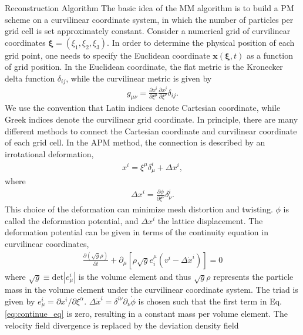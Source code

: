 \begin{section}{Reconstruction Algorithm}
  \label{sec:reconstruction}
   The basic idea of the MM algorithm is to build a PM scheme on a curvilinear coordinate system, 
in which the number of particles per grid cell is set approximately constant. 
    Consider a numerical grid of curvilinear coordinates 
$\bm{\xi}=\left(\xi_1,\xi_2,\xi_3\right)$. In order to determine the physical position 
of each grid point, one needs to specify the Euclidean coordinate $\bm{x}(\bm{\xi},t)$ 
as a function of grid position. In the Euclidean coordinate, the flat metric is the Kronecker 
delta function $\delta_{ij}$, while the curvilinear metric is given by
\begin{align}
    g_{\mu\nu}=\frac{\partial x^i}{\partial \xi ^\mu} \frac{\partial x^j}{\partial \xi ^\nu}\delta_{ij}.
\end{align}
    We use the convention that Latin indices denote Cartesian coordinate, 
while Greek indices denote the curvilinear grid coordinate.
    In principle, there are many different methods to connect the Cartesian 
coordinate and curvilinear coordinate of each grid cell. In the APM method, the 
connection is described by an irrotational deformation,
\begin{align}
    x^i=\xi ^\mu \delta ^i _\mu + \Delta x^i,
\end{align}
where
\begin{align}
 \label{eq:disp}
    \Delta x^i=\frac{\partial \phi}{\partial \xi ^ \nu}\delta ^i _\nu .
\end{align}
    This choice of the deformation can minimize mesh distortion and twisting. $\phi$ is called 
the deformation potential, and $\Delta x^i$ the lattice displacement. The deformation potential 
can be given in terms of the continuity equation in curvilinear coordinates,
\begin{align}
 \label{eq:continue_eq}
    \frac{\partial (\sqrt{g} \rho) }{\partial t}+\partial_\mu \left[\rho \sqrt{g} e^\mu _i \left(v^i - \Delta \dot{x}^i \right) \right] =0
\end{align}
where $\sqrt{g} \equiv \mathrm{det}\left| e^i_\mu\right|$ is the volume element 
and thus $\sqrt{g} \rho$ represents the particle mass in the volume element under the curvilinear 
coordinate system. The triad is given by $e^i_\mu = \partial x^i / \partial \xi ^ \alpha$. 
$\Delta \dot{x}^i=\delta ^{i\nu}\partial _\nu \dot{\phi}$ is chosen such that the first 
term in Eq. \ref{eq:continue_eq} is zero, resulting in a constant mass per volume 
element. The velocity field divergence is replaced by the deviation density field 

\end{section}
